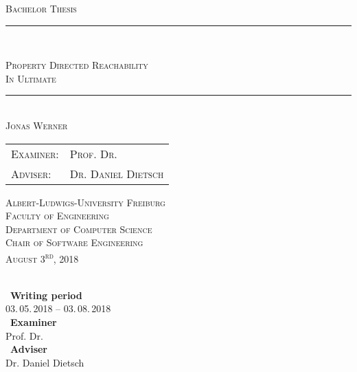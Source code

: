 \documentclass[11pt, a4paper, BCOR=10mm, ngerman, oneside]{scrbook}
\begin{document}
\begin{titlepage}
\begin{center}

\newcommand{\HorizontalLine}{\rule{\linewidth}{0.3mm}}

	{\scshape\Large Bachelor Thesis\par}


\HorizontalLine \\[0.4cm]
	{\huge\scshape Property Directed Reachability \\ \Large{In Ultimate} \par}
\HorizontalLine \\[1.5cm]


	{\Large \scshape Jonas Werner}\\[5cm]


\begin{tabular}[scshape]{>{\normalsize}l >{\normalsize}l}
  \scshape Examiner: & \scshape Prof. Dr. \\[0.3cm]
  \scshape Adviser: & \scshape Dr. Daniel Dietsch  \\[1.2cm]
\end{tabular}
\vfill  %

\large { \scshape
    Albert-Ludwigs-University Freiburg\\
    Faculty of Engineering\\
    Department of Computer Science\\
    Chair of Software Engineering \\[1cm]

    August 3\textsuperscript{rd}, 2018\\
}
\end{center}
\end{titlepage}

    \pagestyle{plain} %
    \frontmatter  %

\ \vfill \ \\  %
\
\textbf{Writing period}            \smallskip{} \\
03.\,05.\,2018 -- 03.\,08.\,2018   \bigskip{} \\
\
\textbf{Examiner}                  \smallskip{} \\
Prof. Dr. \bigskip{} \\
\
\textbf{Adviser}                  \smallskip{} \\
Dr. Daniel Dietsch
\end{document}
